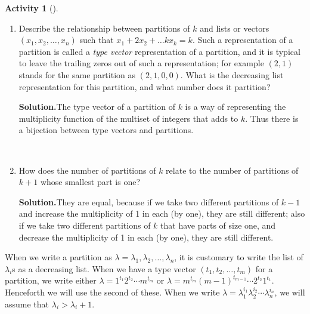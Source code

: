 \documentclass[10pt,]{book}
\theoremstyle{plain}
\theoremstyle{definition}
\newtheorem{activity}[project]{Activity}
\numberwithin{equation}{chapter}
\begin{document}
\begin{activity}[]\label{activity-51}
~\par
\begin{enumerate}[label=(\alph*)]
 \item Describe the relationship between partitions of \(k\) and lists or vectors \((x_1,x_2,\ldots,x_n)\) such that \(x_1+2x_2+\ldots kx_k = k\). Such a representation of a partition is called a \emph{type vector} representation of a partition, and it is typical to leave the trailing zeros out of such a representation; for example \((2,1)\) stands for the same partition as \((2,1,0,0)\). What is the decreasing list representation for this partition, and what number does it partition?%
\par\medskip\noindent%
\textbf{Solution.}\quad The type vector of a partition of \(k\) is a way of representing the multiplicity function of the multiset of integers that adds to \(k\). Thus there is a bijection between type vectors and partitions.%

~\par
\item How does the number of partitions of \(k\) relate to the number of partitions of \(k+1\) whose smallest part is one?%
\par\medskip\noindent%
\textbf{Solution.}\quad They are equal, because if we take two different partitions of \(k-1\) and increase the multiplicity of 1 in each (by one), they are still different; also if we take two different partitions of \(k\) that have parts of size one, and decrease the multiplicity of 1 in each (by one), they are still different.%

\end{enumerate}
\end{activity}
When we write a partition as \(\lambda =
\lambda_1,\lambda_2,\ldots,\lambda_n\), it is customary to write the list of \(\lambda_i\)s as a decreasing list. When we have a type vector \((t_1,t_2,\ldots,t_m)\) for a partition, we write either \(\lambda =
1^{t_1}2^{t_2}\cdots m^{t_m}\) or \(\lambda =  m^{t_m}(m-1)^{t_{m-1}}\cdots
2^{t_2}1^{t_1}\). Henceforth we will use the second of these. When we write \(\lambda=\lambda_1^{i_1}\lambda_2^{i_2}\cdots\lambda_n^{i_n}\), we will assume that \(\lambda_i>\lambda_i+1\).%
\typeout{************************************************}
\typeout{************************************************}
\end{document}
